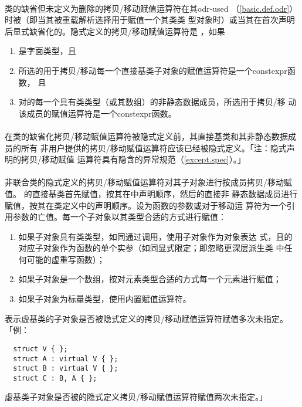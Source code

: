 \paragraph{}
类的缺省但未定义为删除的拷贝/移动赋值运算符在其odr-used
（\ref{basic.def.odr}）时被（即当其被重载解析选择用于赋值一个其类类
型对象时）或当其在首次声明后显式缺省化的。隐式定义的拷贝/移动赋值运算符是
，如果
\begin{enumerate}
  \item{是字面类型，且}
  \item{所选的用于拷贝/移动每一个直接基类子对象的赋值运算符是一个constexpr函数，
    且}
  \item{对的每一个具有类类型（或其数组）的非静态数据成员，所选用于拷贝/移
    动该成员的赋值运算符是一个constexpr函数。}
\end{enumerate}

\paragraph{}
在类的缺省化拷贝/移动赋值运算符被隐式定义前，其直接基类和其非静态数据成员的所有
非用户提供的拷贝/移动赋值运算符应该已经被隐式定义。「注：隐式声明的拷贝/移动赋值
运算符具有隐含的异常规范（\ref{except.spec}）。」

\paragraph{}
非联合类的隐式定义的拷贝/移动赋值运算符对其子对象进行按成员拷贝/移动赋值。
的直接基类首先赋值，按其在中声明顺序，然后的直接非
静态数据成员进行赋值，按其在类定义中的声明顺序。设为函数的参数或对于移动运
算符为一个引用参数的亡值。每一个子对象以其类型合适的方式进行赋值：
\begin{enumerate}
  \item{如果子对象具有类类型，如同通过调用，使用子对象作为对象表达
    式，且的对应子对象作为函数的单个实参（如同显式限定；即忽略更深层派生类
    中任何可能的虚重写函数）；}
  \item{如果子对象是一个数组，按对元素类型合适的方式每一个元素进行赋值；}
  \item{如果子对象为标量类型，使用内置赋值运算符。}
\end{enumerate}
表示虚基类的子对象是否被隐式定义的拷贝/移动赋值运算符赋值多次未指定。「例：
\begin{lstlisting}
  struct V { };
  struct A : virtual V { };
  struct B : virtual V { };
  struct C : B, A { };
\end{lstlisting}
虚基类子对象是否被的隐式定义拷贝/移动赋值运算符赋值两次未指定。」

